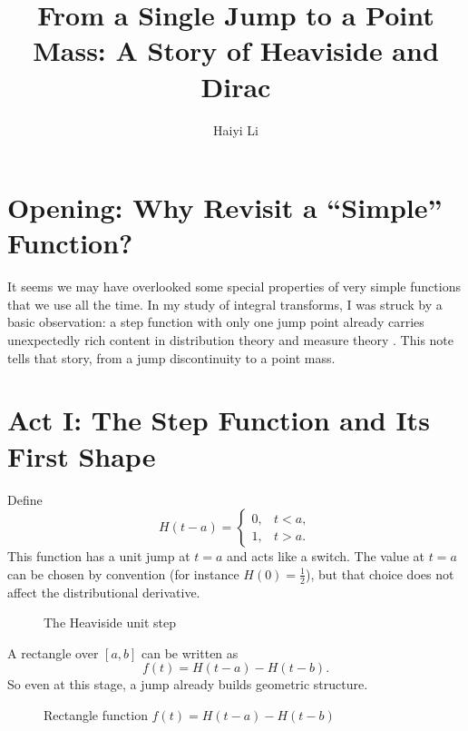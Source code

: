 \documentclass[12pt]{article}
\title{From a Single Jump to a Point Mass: A Story of Heaviside and Dirac}
\author{Haiyi Li}
\date{}
\begin{document}
\maketitle

\section{Opening: Why Revisit a ``Simple'' Function?}

It seems we may have overlooked some special properties of very simple functions
that we use all the time.
In my study of integral transforms, I was struck by a basic observation:
a step function with only one jump point already carries unexpectedly rich content
in distribution theory and measure theory \cite{AndrewsShivamoggi1999}.
This note tells that story, from a jump discontinuity to a point mass.

\section{Act I: The Step Function and Its First Shape}

Define
\[
 H(t-a)=
 \begin{cases}
 0, & t<a,\\
 1, & t>a.
 \end{cases}
\]
This function has a unit jump at $t=a$ and acts like a switch.
The value at $t=a$ can be chosen by convention (for instance $H(0)=\tfrac12$),
but that choice does not affect the distributional derivative.

\begin{figure}[h]
  \centering
  \caption{The Heaviside unit step}
\end{figure}

A rectangle over $[a,b]$ can be written as
\[
 f(t)=H(t-a)-H(t-b).
\]
So even at this stage, a jump already builds geometric structure.

\begin{figure}[h]
  \centering
  \caption{Rectangle function $f(t)=H(t-a)-H(t-b)$}
\end{figure}
\end{document}
